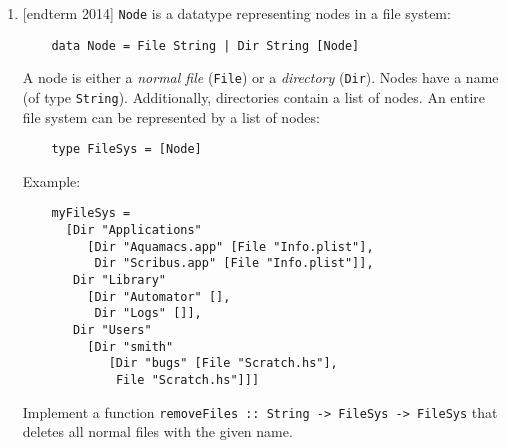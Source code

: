 \documentclass{article}
\def\code#1{\texttt{#1}}
\begin{document}
\begin{enumerate}
    \item {[endterm 2014]} \code{Node} is a datatype representing nodes in a file system:
        \begin{verbatim}
    data Node = File String | Dir String [Node]
        \end{verbatim}
        A node is either a \textit{normal file} (\code{File}) or a \textit{directory} (\code{Dir}). Nodes have a name (of type \code{String}). Additionally, directories contain a list of nodes. An entire file system can be represented by a list of nodes:
        \begin{verbatim}
    type FileSys = [Node]
        \end{verbatim}
        Example:
        \begin{verbatim}
    myFileSys =
      [Dir "Applications"
         [Dir "Aquamacs.app" [File "Info.plist"],
          Dir "Scribus.app" [File "Info.plist"]],
       Dir "Library"
         [Dir "Automator" [],
          Dir "Logs" []],
       Dir "Users"
         [Dir "smith"
            [Dir "bugs" [File "Scratch.hs"],
             File "Scratch.hs"]]]
        \end{verbatim}
        Implement a function \code{removeFiles :: String -> FileSys -> FileSys} that deletes all normal files with the given name.


\end{enumerate}
\end{document}
